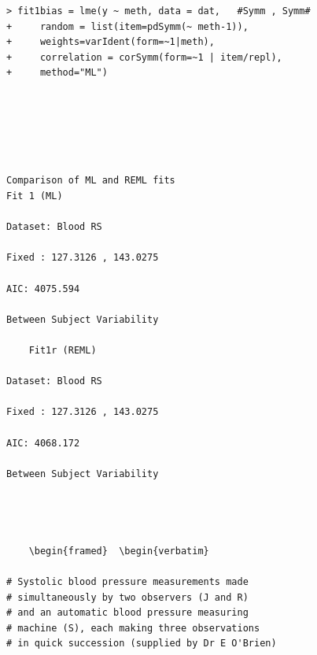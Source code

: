 \documentclass[12pt, a4paper]{report}
\theoremstyle{plain}
\theoremstyle{definition}
\theoremstyle{remark}
\begin{document}
\begin{framed}
\begin{verbatim}
  
 


 





> fit1bias = lme(y ~ meth, data = dat,   #Symm , Symm#
+     random = list(item=pdSymm(~ meth-1)), 
+     weights=varIdent(form=~1|meth),
+     correlation = corSymm(form=~1 | item/repl), 
+     method="ML")



 
 

Comparison of ML and REML fits
Fit 1 (ML)

Dataset: Blood RS

Fixed : 127.3126 , 143.0275

AIC: 4075.594

Between Subject Variability

 	Fit1r (REML)

Dataset: Blood RS

Fixed : 127.3126 , 143.0275

AIC: 4068.172

Between Subject Variability

 

 
	\begin{framed}	\begin{verbatim}

# Systolic blood pressure measurements made 
# simultaneously by two observers (J and R) 
# and an automatic blood pressure measuring
# machine (S), each making three observations 
# in quick succession (supplied by Dr E O'Brien)


\end{verbatim}
\end{framed}
\end{document}
